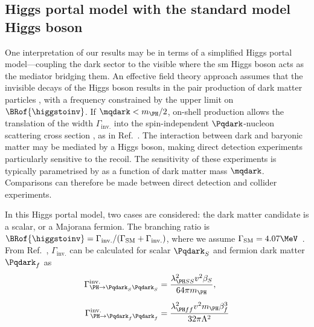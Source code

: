

\subsection{Higgs portal model with the standard model Higgs boson}
\label{subsec:htoinv_dark_matter_higgs_portal}

One interpretation of our results may be in terms of a simplified Higgs portal model---coupling the dark sector to the visible where the \acrshort{sm} Higgs boson acts as the mediator bridging them. An effective field theory approach assumes that the invisible decays of the Higgs boson results in the pair production of dark matter particles \Pqdark, with a frequency constrained by the upper limit on $\BRof{\higgstoinv}$. If $\mqdark < m_{\PH}/\text{2}$, on-shell production allows the translation of the \higgstoinv width $\Gamma_{\mathrm{inv.}}$ into the spin-independent $\Pqdark$-nucleon scattering cross section \xsecSI, as in Ref.~. The interaction between dark and baryonic matter may be mediated by a Higgs boson, making direct detection experiments particularly sensitive to the recoil. The sensitivity of these experiments is typically parametrised by \xsecSI as a function of dark matter mass $\mqdark$. Comparisons can therefore be made between direct detection and collider experiments.

In this Higgs portal model, two cases are considered: the dark matter candidate is a scalar, or a Majorana fermion. The branching ratio is $\BRof{\higgstoinv} = \Gamma_{\mathrm{inv.}}/(\Gamma_{\mathrm{SM}} + \Gamma_{\mathrm{inv.}})$, where we assume $\Gamma_{\mathrm{SM}} = \text{4.07}\MeV$~\cite{Heinemeyer:1559921}. From Ref.~, $\Gamma_{\mathrm{inv.}}$ can be calculated for scalar $\Pqdark_{S}$ and fermion dark matter $\Pqdark_{f}$ as
\begin{equation}
    \begin{aligned}
\Gamma^{\mathrm{inv.}}_{\PH \rightarrow \Pqdark_{S}\Pqdark_{S}} &= \frac{ \lambda^2_{\PH SS} v^2 \beta_S }{64\pi m_{\PH}},\\[0.5em]
\Gamma^{\mathrm{inv.}}_{\PH \rightarrow \Pqdark_{f}\Pqdark_{f}} &= \frac{ \lambda^2_{\PH ff} v^2 m_{\PH} \beta_f^3 }{ 32\pi \Lambda^2 }
    \end{aligned}
\end{equation}

